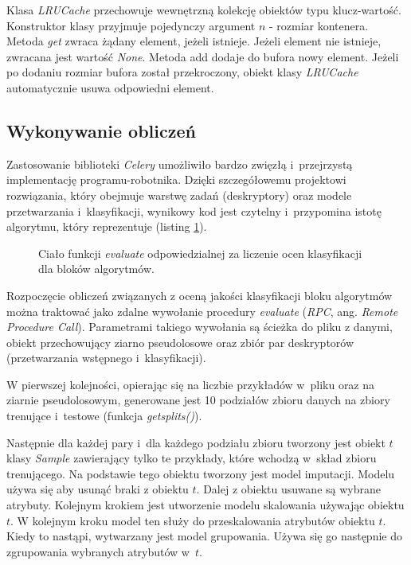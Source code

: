 \documentclass[../thesis.tex]{subfiles}
\begin{document}
Klasa \emph{LRUCache} przechowuje wewnętrzną kolekcję obiektów typu klucz-wartość. Konstruktor klasy przyjmuje pojedynczy argument $n$ - rozmiar kontenera. Metoda \emph{get} zwraca żądany element, jeżeli istnieje. Jeżeli element nie istnieje, zwracana jest wartość \emph{None}. Metoda add dodaje do bufora nowy element. Jeżeli po dodaniu rozmiar bufora został przekroczony, obiekt klasy \emph{LRUCache} automatycznie usuwa odpowiedni element.

\subsection{Wykonywanie obliczeń}

Zastosowanie biblioteki \emph{Celery} umożliwiło bardzo zwięzłą i~przejrzystą implementację programu-robotnika. Dzięki szczegółowemu projektowi rozwiązania, który obejmuje warstwę zadań (deskryptory) oraz modele przetwarzania i~klasyfikacji, wynikowy kod jest czytelny i~przypomina istotę algorytmu, który reprezentuje (listing \ref{impl:snippet_worker}).

\begin{figure}[h]
\centering
{}

\caption{Ciało funkcji \emph{evaluate} odpowiedzialnej za liczenie ocen klasyfikacji dla bloków algorytmów.}
\label{impl:snippet_worker}
\end{figure}

Rozpoczęcie obliczeń związanych z oceną jakości klasyfikacji bloku algorytmów można traktować jako zdalne wywołanie procedury \emph{evaluate} (\emph{RPC}, ang. \emph{Remote Procedure Call}). Parametrami takiego wywołania są ścieżka do pliku z danymi, obiekt przechowujący ziarno pseudolosowe oraz zbiór par deskryptorów (przetwarzania wstępnego i~klasyfikacji).

W pierwszej kolejności, opierając się na liczbie przykładów w~pliku oraz na ziarnie pseudolosowym, generowane jest 10 podziałów zbioru danych na zbiory trenujące i~testowe (funkcja \emph{get\textunderscore splits()}).

Następnie dla każdej pary i~dla każdego podziału zbioru tworzony jest obiekt $t$ klasy \emph{Sample} zawierający tylko te przykłady, które wchodzą w~skład zbioru trenującego. Na podstawie tego obiektu tworzony jest model imputacji. Modelu używa się aby usunąć braki z obiektu $t$. Dalej z obiektu usuwane są wybrane atrybuty. Kolejnym krokiem jest utworzenie modelu skalowania używając obiektu $t$. W kolejnym kroku model ten służy do przeskalowania atrybutów obiektu $t$. Kiedy to nastąpi, wytwarzany jest model grupowania. Używa się go następnie do zgrupowania wybranych atrybutów w~$t$.
\end{document}
